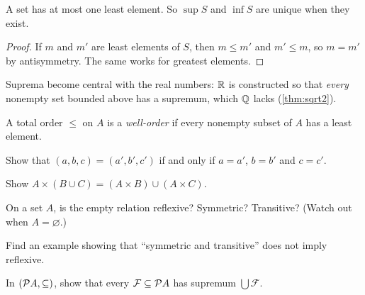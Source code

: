 \begin{lemma}
\label{lem:least-unique}
A set has at most one least element. So $\sup S$ and $\inf S$ are unique when they
exist.
\end{lemma}

\begin{proof}
If $m$ and $m'$ are least elements of $S$, then $m \le m'$ and $m' \le m$, so $m
= m'$ by antisymmetry. The same works for greatest elements.
\end{proof}

Suprema become central with the real numbers: $\mathbb{R}$ is constructed so that
\emph{every} nonempty set bounded above has a supremum, which $\mathbb{Q}$ lacks
(\cref{thm:sqrt2}).

\begin{definition}
\label{def:well-order}
A total order $\le$ on $A$ is a \emph{well-order} if every nonempty subset of $A$
has a least element.
\end{definition}

\begin{exercises}
  \item Show that $(a, b, c) = (a', b', c')$ if and only if $a = a'$, $b = b'$ and
    $c = c'$.
  \item Show $A \times (B \cup C) = (A \times B) \cup (A \times C)$.
  \item On a set $A$, is the empty relation reflexive? Symmetric? Transitive?
    (Watch out when $A = \varnothing$.)
  \item Find an example showing that \enquote{symmetric and transitive} does not
    imply reflexive.
  \item In $(\mathcal{P} A, \subseteq)$, show that every $\mathcal{F} \subseteq \mathcal{P} A$
    has supremum $\bigcup \mathcal{F}$.
\end{exercises}
